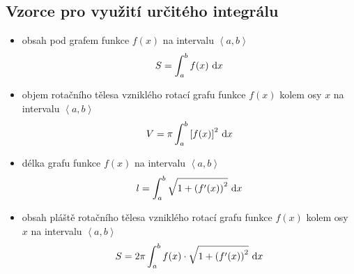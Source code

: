 \subsection*{Vzorce pro využití určitého integrálu}
\begin{itemize}
\item obsah pod grafem funkce $f(x)$ na intervalu $\left<  a,b \right> $
$$S=\int_a ^b f(x)\, \mathop{}\!\mathrm{d} x$$
\item objem rotačního tělesa vzniklého rotací grafu funkce $f(x)$ kolem osy $x$ na intervalu $\left<  a,b \right> $
$$V=\pi \int_a ^b \left [ f(x) \right ]^2 \, \mathop{}\!\mathrm{d} x $$
\item délka grafu funkce $f(x)$ na intervalu $\left<  a,b \right> $
$$l=\int_a^b \sqrt{1+\left ( f^\prime(x) \right )^2 } \, \mathop{}\!\mathrm{d} x$$
\item obsah pláště rotačního tělesa vzniklého rotací grafu funkce $f(x)$ kolem osy $x$ na intervalu $\left<  a,b \right> $
$$S=2\pi \int _a ^b f(x)\cdot \sqrt{1+\left ( f^\prime(x) \right )^2 }\, \mathop{}\!\mathrm{d} x $$
\end{itemize}
